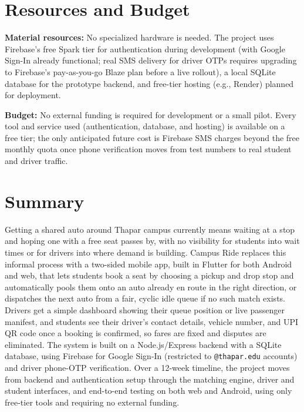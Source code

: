 \documentclass[11pt]{article}
\begin{document}
\section{Resources and Budget}
\textbf{Material resources:} No specialized hardware is needed. The project uses Firebase's free Spark tier for authentication during development (with Google Sign-In already functional; real SMS delivery for driver OTPs requires upgrading to Firebase's pay-as-you-go Blaze plan before a live rollout), a local SQLite database for the prototype backend, and free-tier hosting (e.g., Render) planned for deployment.

\textbf{Budget:} No external funding is required for development or a small pilot. Every tool and service used (authentication, database, and hosting) is available on a free tier; the only anticipated future cost is Firebase SMS charges beyond the free monthly quota once phone verification moves from test numbers to real student and driver traffic.

\section{Summary}
Getting a shared auto around Thapar campus currently means waiting at a stop and hoping one with a free seat passes by, with no visibility for students into wait times or for drivers into where demand is building. Campus Ride replaces this informal process with a two-sided mobile app, built in Flutter for both Android and web, that lets students book a seat by choosing a pickup and drop stop and automatically pools them onto an auto already en route in the right direction, or dispatches the next auto from a fair, cyclic idle queue if no such match exists. Drivers get a simple dashboard showing their queue position or live passenger manifest, and students see their driver's contact details, vehicle number, and UPI QR code once a booking is confirmed, so fares are fixed and disputes are eliminated. The system is built on a Node.js/Express backend with a SQLite database, using Firebase for Google Sign-In (restricted to \texttt{@thapar.edu} accounts) and driver phone-OTP verification. Over a 12-week timeline, the project moves from backend and authentication setup through the matching engine, driver and student interfaces, and end-to-end testing on both web and Android, using only free-tier tools and requiring no external funding.
\end{document}
